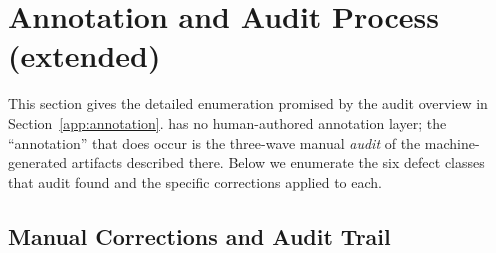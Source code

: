 %
%

\section{Annotation and Audit Process (extended)}
\label{app:annotation_audit_detail}

This section gives the detailed enumeration promised by the audit overview in
Section~\ref{app:annotation}. \bench{} has no human-authored annotation layer;
the ``annotation'' that does occur is the three-wave manual \emph{audit} of the
machine-generated artifacts described there. Below we enumerate the six defect
classes that audit found and the specific corrections applied to each.

\subsection{Manual Corrections and Audit Trail}
\label{sec:generation-corrections}

